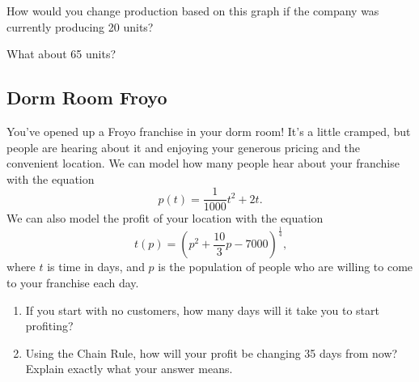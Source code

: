 \documentclass[handout]{ximera}
\begin{document}
\begin{question}
How would you change production based on this graph if the company was currently producing 20 units? 
\begin{multipleChoice}
\end{multipleChoice}
What about 65 units?
\begin{multipleChoice}
\end{multipleChoice}
\end{question}
\subsection{Dorm Room Froyo}
You've opened up a Froyo franchise in your dorm room! It's a little cramped, but people are hearing about it and enjoying your generous pricing and the convenient location. We can model how many people hear about your franchise with the equation $$p(t) = \frac{1}{1000}t^2 + 2t \text{.}$$ We can also model the profit of your location with the equation $$t(p) = (p^2 + \frac{10}{3}p - 7000)^{\frac{1}{4}} \text{,}$$ where $t$ is time in days, and $p$ is the population of people who are willing to come to your franchise each day.

\begin{enumerate}
\item{If you start with no customers, how many days will it take you to start profiting?}
\item{Using the Chain Rule, how will your profit be changing 35 days from now? Explain exactly what your answer means.}
\end{enumerate}
\pagebreak
\end{document}
